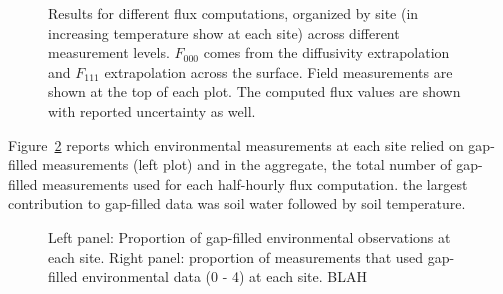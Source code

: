 \documentclass[
  letterpaper,
  DIV=11,
  numbers=noendperiod]{scrartcl}
\begin{document}
\begin{figure}


\caption{\label{fig-flux-results}Results for different flux
computations, organized by site (in increasing temperature show at each
site) across different measurement levels. \(F_{000}\) comes from the
diffusivity extrapolation and \(F_{111}\) extrapolation across the
surface. Field measurements are shown at the top of each plot. The
computed flux values are shown with reported uncertainty as well.}

\end{figure}%

Figure~\ref{fig-gap-filled-stats} reports which environmental
measurements at each site relied on gap-filled measurements (left plot)
and in the aggregate, the total number of gap-filled measurements used
for each half-hourly flux computation. the largest contribution to
gap-filled data was soil water followed by soil temperature.

\begin{figure}


\caption{\label{fig-gap-filled-stats}Left panel: Proportion of
gap-filled environmental observations at each site. Right panel:
proportion of measurements that used gap-filled environmental data (0 -
4) at each site. BLAH}

\end{figure}%
\end{document}
